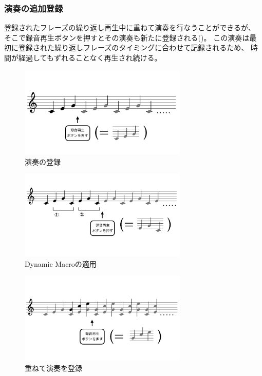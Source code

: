 \subsubsection{演奏の追加登録}

登録されたフレーズの繰り返し再生中に重ねて演奏を行なうことができるが、
そこで録音再生ボタンを押すとその演奏も新たに登録される()。
この演奏は最初に登録された繰り返しフレーズのタイミングに合わせて記録されるため、
時間が経過してもずれることなく再生され続ける。

\begin{figure}[tb]
\includegraphics[width=8cm,bb=0 0 926 504]{images/rp1.png}
\centering
\caption{演奏の登録}
\label{recplay1}
\end{figure}

\begin{figure}[tb]
\includegraphics[width=8cm,bb=0 0 1054 481]{images/rp2.png}
\centering
\caption{Dynamic Macroの適用}
\label{recplay2}
\end{figure}

\begin{figure}[tb]
\includegraphics[width=8cm,bb=0 0 1054 481]{images/rp3.png}
\centering
\caption{重ねて演奏を登録}
\label{recplay3}
\end{figure}

